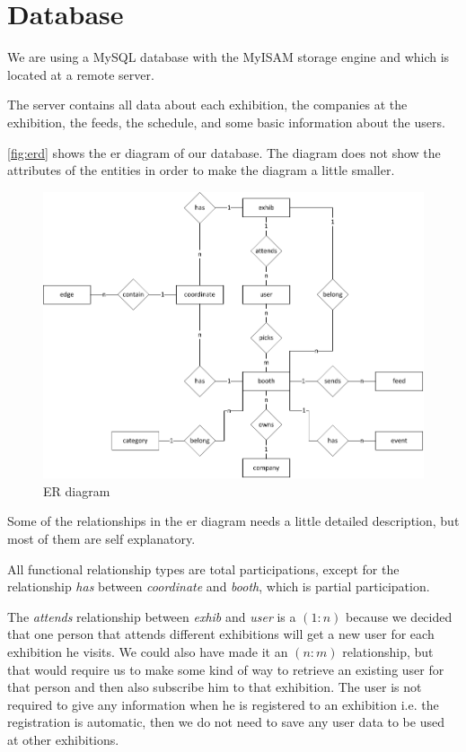 \section{Database}
We are using a MySQL database with the MyISAM storage engine and which is located at a remote server. 

The server contains all data about each exhibition, the companies at the exhibition, the feeds, the schedule, and some basic information about the users.

\autoref{fig:erd} shows the \ac{er} diagram of our database. The diagram does not show the attributes of the entities in order to make the diagram a little smaller.

\begin{figure}[H]
\centering
\includegraphics[page=1,width=1\linewidth]{img/sw7ERD.pdf}
\caption{ER diagram}
\label{fig:erd}
\end{figure}

\newcommand{\rel}[2]{$(#1:#2)$}

Some of the relationships in the \ac{er} diagram needs a little detailed description, but most of them are self explanatory.

All functional relationship types are total participations, except for the relationship \textit{has} between \textit{coordinate} and \textit{booth}, which is partial participation.

The \textit{attends} relationship between \textit{exhib} and \textit{user} is a \rel{1}{n} because we decided that one person that attends different exhibitions will get a new user for each exhibition he visits. We could also have made it an \rel{n}{m} relationship, but that would require us to make some kind of way to retrieve an existing user for that person and then also subscribe him to that exhibition. The user is not required to give any information when he is registered to an exhibition i.e. the registration is automatic, then we do not need to save any user data to be used at other exhibitions.

